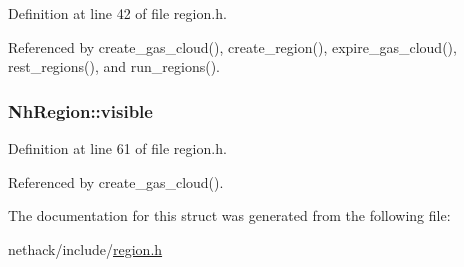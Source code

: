 Definition at line 42 of file region.\+h.



Referenced by create\+\_\+gas\+\_\+cloud(), create\+\_\+region(), expire\+\_\+gas\+\_\+cloud(), rest\+\_\+regions(), and run\+\_\+regions().

\hypertarget{structNhRegion_a2ab12427b9c9d84da999feba4f7ea9cd}{
\subsubsection[{visible}]{ Nh\+Region\+::visible}}\label{structNhRegion_a2ab12427b9c9d84da999feba4f7ea9cd}


Definition at line 61 of file region.\+h.



Referenced by create\+\_\+gas\+\_\+cloud().



The documentation for this struct was generated from the following file\+:\begin{DoxyCompactItemize}
\item 
nethack/include/\hyperlink{region_8h}{region.\+h}\end{DoxyCompactItemize}
